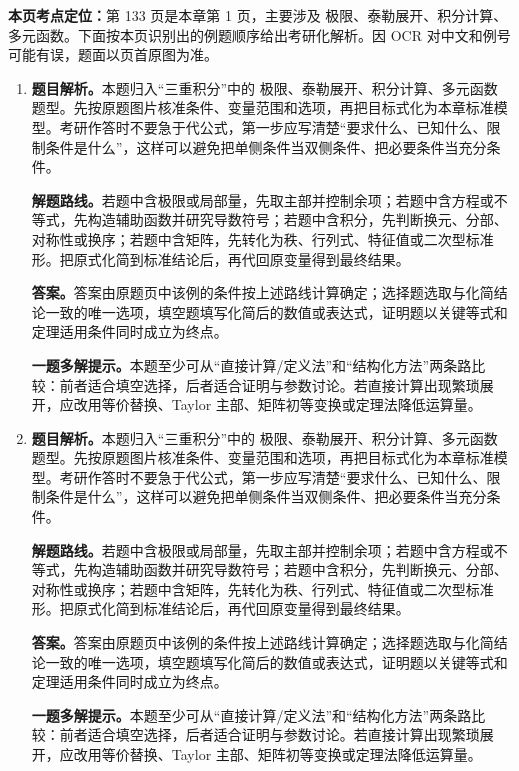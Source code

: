 \begin{solutionblock}
\textbf{本页考点定位：}第 133 页是本章第 1 页，主要涉及 极限、泰勒展开、积分计算、多元函数。下面按本页识别出的例题顺序给出考研化解析。因 OCR 对中文和例号可能有误，题面以页首原图为准。

\begin{enumerate}[label=\textbf{例\arabic*.}, leftmargin=2.4em]

\item \textbf{题目解析。}本题归入“三重积分”中的 极限、泰勒展开、积分计算、多元函数 题型。先按原题图片核准条件、变量范围和选项，再把目标式化为本章标准模型。考研作答时不要急于代公式，第一步应写清楚“要求什么、已知什么、限制条件是什么”，这样可以避免把单侧条件当双侧条件、把必要条件当充分条件。

\textbf{解题路线。}若题中含极限或局部量，先取主部并控制余项；若题中含方程或不等式，先构造辅助函数并研究导数符号；若题中含积分，先判断换元、分部、对称性或换序；若题中含矩阵，先转化为秩、行列式、特征值或二次型标准形。把原式化简到标准结论后，再代回原变量得到最终结果。

\textbf{答案。}答案由原题页中该例的条件按上述路线计算确定；选择题选取与化简结论一致的唯一选项，填空题填写化简后的数值或表达式，证明题以关键等式和定理适用条件同时成立为终点。

\textbf{一题多解提示。}本题至少可从“直接计算/定义法”和“结构化方法”两条路比较：前者适合填空选择，后者适合证明与参数讨论。若直接计算出现繁琐展开，应改用等价替换、Taylor 主部、矩阵初等变换或定理法降低运算量。

\item \textbf{题目解析。}本题归入“三重积分”中的 极限、泰勒展开、积分计算、多元函数 题型。先按原题图片核准条件、变量范围和选项，再把目标式化为本章标准模型。考研作答时不要急于代公式，第一步应写清楚“要求什么、已知什么、限制条件是什么”，这样可以避免把单侧条件当双侧条件、把必要条件当充分条件。

\textbf{解题路线。}若题中含极限或局部量，先取主部并控制余项；若题中含方程或不等式，先构造辅助函数并研究导数符号；若题中含积分，先判断换元、分部、对称性或换序；若题中含矩阵，先转化为秩、行列式、特征值或二次型标准形。把原式化简到标准结论后，再代回原变量得到最终结果。

\textbf{答案。}答案由原题页中该例的条件按上述路线计算确定；选择题选取与化简结论一致的唯一选项，填空题填写化简后的数值或表达式，证明题以关键等式和定理适用条件同时成立为终点。

\textbf{一题多解提示。}本题至少可从“直接计算/定义法”和“结构化方法”两条路比较：前者适合填空选择，后者适合证明与参数讨论。若直接计算出现繁琐展开，应改用等价替换、Taylor 主部、矩阵初等变换或定理法降低运算量。


\end{enumerate}
\end{solutionblock}

